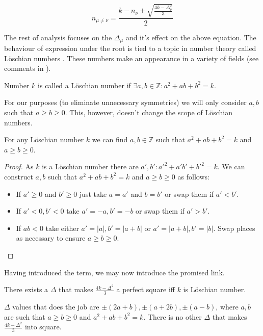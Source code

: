     \begin{equation}
        \label{v3:eq:relations_delta}
        n_{\mu\neq \nu} = \frac{k-n_\nu \pm \sqrt{\frac{4k-\Delta_\nu^2}{3}}}{2}
    \end{equation}

    The rest of analysis focuses on the $\Delta_\mu$ and it's effect on the above equation. The behaviour of expression under the root is tied to a topic in number theory called Löschian numbers \cite{oeisA003136}. These numbers make an appearance in a variety of fields (see comments in \cite{oeisA003136}).

    \begin{definition}
        \label{v3:def:loeshian}
        Number $k$ is called a Löschian number if $\exists a,b \in \mathbb Z \colon a^2+ab+b^2=k$.
    \end{definition}

    For our purposes (to eliminate unnecessary symmetries) we will only consider $a,b$ such that $a \geq b \geq 0$. This, however, doesn't change the scope of Löschian numbers.

    \begin{lemma}
        \label{v3:lemma:loeschian}
        For any Löschian number $k$ we can find $a,b \in \mathbb Z$ such that $a^2+ab+b^2=k$ and $a \geq b \geq 0$.
    \end{lemma}

    \begin{proof}
        As $k$ is a Löschian number there are $a',b' \colon a'^2+a'b'+b'^2=k$. We can construct $a,b$ such that $a^2+ab+b^2=k$ and $a \geq b \geq 0$ as follows:
        \begin{itemize}
            \item If $a' \geq 0$ and $b' \geq 0$ just take $a=a'$ and $b=b'$ or swap them if $a'<b'$.
            \item If $a'<0,b'<0$ take $a'=-a,b'=-b$ or swap them if $a'>b'$.
            \item If $ab<0$ take either $a'=|a|, b'=|a+b|$ or $a'=|a+b|, b'=|b|$. Swap places as necessary to ensure $a \geq b \geq 0$.
        \end{itemize}
    \end{proof}

    Having introduced the term, we may now introduce the promised link.

    \begin{lemma}
        \label{v3:lemma:square}
        There exists a $\Delta$ that makes $\frac{4k-\Delta^2}{3}$ a perfect square iff $k$ is Löschian number.
        
        $\Delta$ values that does the job are $\pm (2a+b), \pm (a+2b), \pm (a-b)$, where $a,b$ are such that $a \geq b \geq 0$ and $a^2+ab+b^2=k$. There is no other $\Delta$ that makes $\frac{4k-\Delta^2}{3}$ into square.
    \end{lemma}

